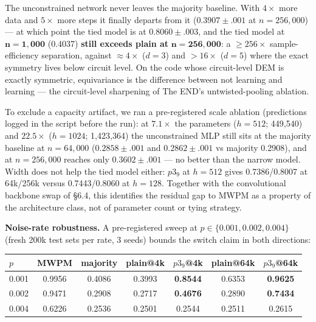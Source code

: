 \documentclass[11pt]{article}
\begin{document}
The unconstrained network never leaves the majority baseline. With $4\times$
more data and $5\times$ more steps it finally departs from it
($0.3907 \pm .001$ at $n = 256{,}000$) --- at which point the tied model is
at $0.8060 \pm .003$, and the tied model at $\mathbf{n = 1{,}000}$ (0.4037)
\textbf{still exceeds plain at} $\mathbf{n = 256{,}000}$: a $\geq 256\times$
sample-efficiency separation, against ${\approx}4\times$ ($d{=}3$) and
$>16\times$ ($d{=}5$) where the exact symmetry lives below circuit level. On
the code whose circuit-level DEM is exactly symmetric, equivariance is the
difference between not learning and learning --- the circuit-level
sharpening of The END's untwisted-pooling ablation.

To exclude a capacity artifact, we ran a pre-registered scale ablation
(predictions logged in the script before the run): at $7.1\times$ the
parameters ($h = 512$; 449{,}540) and $22.5\times$ ($h = 1024$; 1{,}423{,}364)
the unconstrained MLP still sits at the majority baseline at $n = 64{,}000$
($0.2858 \pm .001$ and $0.2862 \pm .001$ vs majority 0.2908), and at
$n = 256{,}000$ reaches only $0.3602 \pm .001$ --- no better than the narrow
model. Width does not help the tied model either: $p3_9$ at $h = 512$ gives
0.7386/0.8007 at 64k/256k versus 0.7443/0.8060 at $h = 128$. Together with
the convolutional backbone swap of \S6.4, this identifies the residual gap
to MWPM as a property of the architecture class, not of parameter count or
tying strategy.

\textbf{Noise-rate robustness.} A pre-registered sweep at
$p \in \{0.001, 0.002, 0.004\}$ (fresh 200k test sets per rate, 3 seeds)
bounds the switch claim in both directions:

\begin{center}
\begin{tabular}{lcccccc}
\toprule
$p$ & MWPM & majority & plain@4k & $p3_9$@4k & plain@64k & $p3_9$@64k \\
\midrule
0.001 & 0.9956 & 0.4086 & 0.3993 & \textbf{0.8544} & 0.6353 & \textbf{0.9625} \\
0.002 & 0.9471 & 0.2908 & 0.2717 & \textbf{0.4676} & 0.2890 & \textbf{0.7434} \\
0.004 & 0.6226 & 0.2536 & 0.2501 & 0.2544 & 0.2511 & 0.2615 \\
\bottomrule
\end{tabular}
\end{center}
\end{document}
